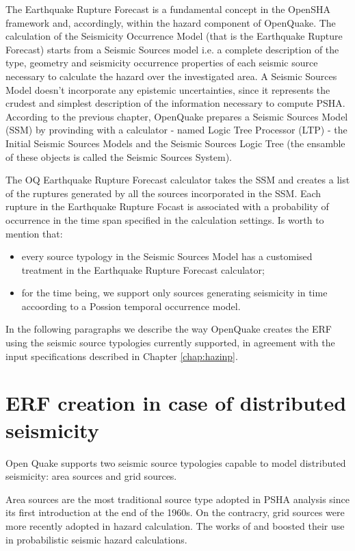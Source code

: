 The Earthquake Rupture Forecast is a fundamental concept in the OpenSHA 
framework and, accordingly, within the hazard component of OpenQuake.
%
The calculation of the Seismicity Occurrence Model (that is the Earthquake 
Rupture Forecast) starts from a Seismic Sources model i.e. a complete 
description of the type, geometry and seismicity occurrence properties 
of each seismic source necessary to calculate the hazard over the 
investigated area. A Seismic Sources Model doesn't incorporate any 
epistemic uncertainties, since it represents the crudest and simplest 
description of the information necessary to compute PSHA.
%
According to the previous chapter, OpenQuake prepares a Seismic Sources 
Model (SSM) by provinding with a calculator - named Logic Tree Processor 
(LTP) - the Initial Seismic Sources Models and the Seismic Sources Logic 
Tree (the ensamble of these objects is called the Seismic Sources System).

%
The OQ Earthquake Rupture Forecast calculator takes the SSM and creates a 
list of the ruptures generated by all the sources incorporated in the SSM. 
Each rupture in the Earthquake Rupture Focast is associated with a probability 
of occurrence in the time span specified in the calculation settings. 
Is worth to mention that: 
\begin{itemize}
\item every source typology in the Seismic Sources Model has a customised 
treatment in the Earthquake Rupture Forecast calculator;
\item for the time being, we support only sources generating seismicity 
in time accoording to a Possion temporal occurrence model.
\end{itemize}

%
In the following paragraphs we describe the way OpenQuake creates the ERF 
using the  seismic source typologies currently supported, in agreement with 
the input specifications described in Chapter \ref{chap:hazinp}.
%
\section{ERF creation in case of distributed seismicity}
Open Quake supports two seismic source typologies capable to model distributed
seismicity: area sources and grid sources.

Area sources are the most traditional source type adopted in PSHA analysis since 
its first introduction at the end of the 1960s. On the contracry, grid sources 
were more recently adopted in hazard calculation. The works of 
\cite{frankel1995} and \cite{frankel1997} boosted their use in probabilistic 
seismic hazard calculations. 
%
